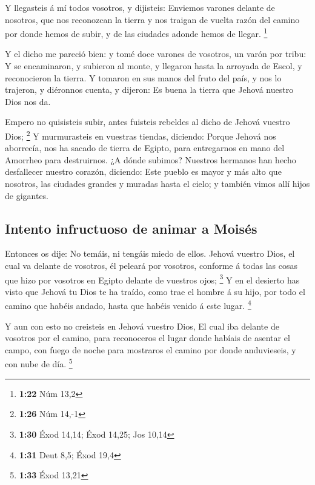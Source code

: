  Y llegasteis á mí todos vosotros, y dijisteis: Enviemos
varones delante de nosotros, que nos reconozcan la tierra y nos traigan
de vuelta razón del camino por donde hemos de subir, y de las ciudades
adonde hemos de llegar. \footnote{\textbf{1:22} Núm 13,2}

 Y el dicho me pareció bien: y tomé doce varones de
vosotros, un varón por tribu:  Y se encaminaron, y
subieron al monte, y llegaron hasta la arroyada de Escol, y reconocieron
la tierra.  Y tomaron en sus manos del fruto del país, y
nos lo trajeron, y diéronnos cuenta, y dijeron: Es buena la tierra que
Jehová nuestro Dios nos da.

 Empero no quisisteis subir, antes fuisteis rebeldes al
dicho de Jehová vuestro Dios; \footnote{\textbf{1:26} Núm 14,-1}
 Y murmurasteis en vuestras tiendas, diciendo: Porque
Jehová nos aborrecía, nos ha sacado de tierra de Egipto, para
entregarnos en mano del Amorrheo para destruirnos.  ¿A
dónde subimos? Nuestros hermanos han hecho desfallecer nuestro corazón,
diciendo: Este pueblo es mayor y más alto que nosotros, las ciudades
grandes y muradas hasta el cielo; y también vimos allí hijos de
gigantes.

\hypertarget{intento-infructuoso-de-animar-a-moisuxe9s}{%
\subsection{Intento infructuoso de animar a
Moisés}\label{intento-infructuoso-de-animar-a-moisuxe9s}}

 Entonces os dije: No temáis, ni tengáis miedo de ellos.
 Jehová vuestro Dios, el cual va delante de vosotros, él
peleará por vosotros, conforme á todas las cosas que hizo por vosotros
en Egipto delante de vuestros ojos; \footnote{\textbf{1:30} Éxod 14,14;
  Éxod 14,25; Jos 10,14}  Y en el desierto has visto que
Jehová tu Dios te ha traído, como trae el hombre á su hijo, por todo el
camino que habéis andado, hasta que habéis venido á este lugar.
\footnote{\textbf{1:31} Deut 8,5; Éxod 19,4}

 Y aun con esto no creisteis en Jehová vuestro Dios,
 El cual iba delante de vosotros por el camino, para
reconoceros el lugar donde habíais de asentar el campo, con fuego de
noche para mostraros el camino por donde anduvieseis, y con nube de día.
\footnote{\textbf{1:33} Éxod 13,21}

